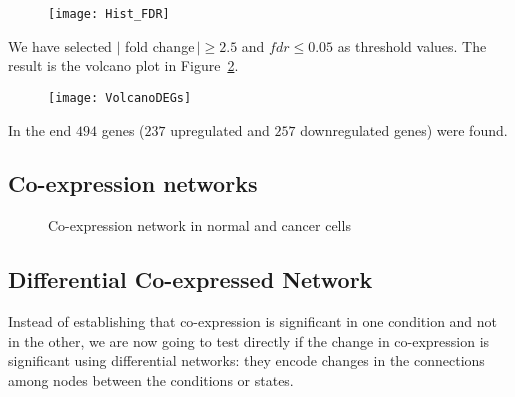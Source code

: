 \documentclass[
10pt, %
a4paper, %
oneside, %
headinclude,footinclude, %
BCOR5mm, %
]{scrartcl}
\begin{document}
\begin{figure}[!h]
\centering 
\texttt{[image: Hist\_FDR]} 
\caption[Histogram of $-\log{(FDR)}$]{} %
\label{fig:2} 
\end{figure}

We have selected  $|$ fold change$\, | \ge 2.5$ and $fdr \le 0.05$ as threshold values. The result is the volcano plot in Figure~\ref{fig:3}.

\begin{figure}[!h]
\centering 
\texttt{[image: VolcanoDEGs]} 
\caption[Volcano Plot]{} %
\label{fig:3} 
\end{figure}

In the end $494$ genes ($237$ upregulated and $257$ downregulated genes) were found.


\subsection{Co-expression networks}


\begin{figure}[!h]
\centering
{} \quad
{} 
\caption[Co-expression network in normal and cancer cells]{Co-expression network in normal and cancer cells} %
\label{fig:esempio}
\end{figure}

\newpage

\subsection{Differential Co-expressed Network}
Instead of establishing that co-expression is significant in one condition and not in the other, we are now going to test directly if the change in co-expression is significant using differential networks: they encode changes in the connections among nodes between the conditions or states.\\
\end{document}
